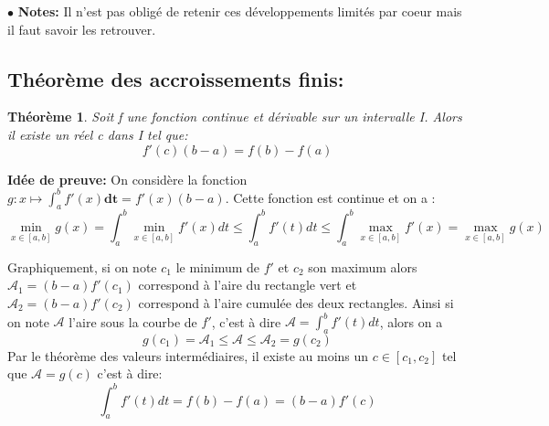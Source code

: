 \documentclass[a4paper]{article}
\theoremstyle{break}
\newtheorem{theo}{Théorème}[section]
\newcommand{\note}{$\bullet$ \textbf{Notes: }}
\begin{document}
\note Il n'est pas obligé de retenir ces développements limités par
coeur mais il faut savoir les retrouver.

\subsection{Théorème des accroissements finis:}
\begin{theo}
  Soit f une fonction continue et dérivable sur un intervalle I. Alors
  il existe un réel c dans I tel que:
  \[
    f'(c)(b-a) = f(b) - f(a)
  \]
\end{theo}

\textbf{Idée de preuve: }
On considère la fonction $g: x \mapsto \int_a^b f'(x) \mathbf{dt} =
f'(x) (b-a)$. Cette fonction est continue et on a :
\[
  \min \limits_{x \in [a,b]} g(x) = \int_a^b \min \limits_{x \in
    [a,b]} f'(x) dt
  \leq  \int_a^b f'(t) dt
  \leq \int_a^b \max \limits_{x \in [a,b]} f'(x) = \max \limits_{x \in [a,b]} g(x)
\]

\begin{center}
\end{center}

Graphiquement, si on note $c_1$ le minimum de $f'$ et $c_2$ son
maximum alors $\mathcal{A}_1 = (b-a) f'(c_1)$ correspond à l'aire du
rectangle vert et $\mathcal{A}_2 = (b-a) f'(c_2)$ correspond à l'aire
cumulée des deux rectangles. Ainsi si on note $\mathcal{A}$ l'aire
sous la courbe de $f'$, c'est à dire $\mathcal{A} = \int_a^b f'(t)dt$,
alors on a
\[
  g(c_1) = \mathcal{A}_1 \leq \mathcal{A} \leq \mathcal{A}_2 = g(c_2)
\]
Par le théorème des valeurs intermédiaires, il existe au moins un $c
\in [c_1,c_2]$ tel que $\mathcal{A} = g(c)$ c'est à dire:
\[
  \int_a^b f'(t) dt = f(b) - f(a) = (b-a)f'(c)
\]
\end{document}
